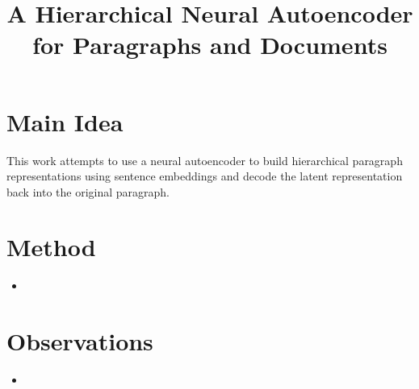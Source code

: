 \documentclass[12pt]{scrartcl}
\begin{document}
\title{A Hierarchical Neural Autoencoder for Paragraphs and Documents}
\author{}
\date{}
\maketitle

\section{Main Idea}
  This work attempts to use a neural autoencoder to build hierarchical paragraph representations using sentence embeddings and decode the latent representation back into the original paragraph. \cite{li2015hierarchical}

\section{Method}
  \begin{itemize}
    \item 
  \end{itemize}

\section{Observations}
  \begin{itemize}
    \item 
  \end{itemize}



\end{document}
